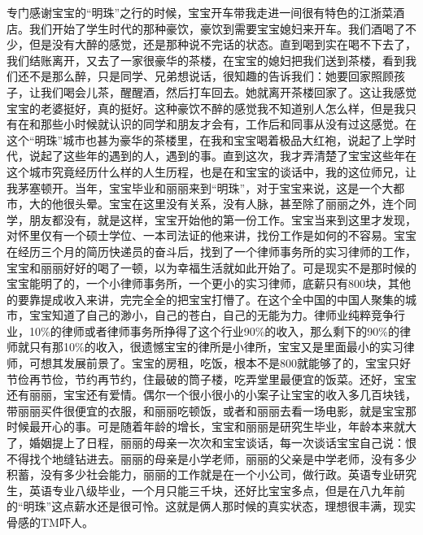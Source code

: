 专门感谢宝宝的“明珠”之行的时候，宝宝开车带我走进一间很有特色的江浙菜酒店。我们开始了学生时代的那种豪饮，豪饮到需要宝宝媳妇来开车。我们酒喝了不少，但是没有大醉的感觉，还是那种说不完话的状态。直到喝到实在喝不下去了，我们结账离开，又去了一家很豪华的茶楼，在宝宝的媳妇把我们送到茶楼，看到我们还不是那么醉，只是同学、兄弟想说话，很知趣的告诉我们：她要回家照顾孩子，让我们喝会儿茶，醒醒酒，然后打车回去。她就离开茶楼回家了。这让我感觉宝宝的老婆挺好，真的挺好。这种豪饮不醉的感觉我不知道别人怎么样，但是我只有在和那些小时候就认识的同学和朋友才会有，工作后和同事从没有过这感觉。在这个“明珠”城市也甚为豪华的茶楼里，在我和宝宝喝着极品大红袍，说起了上学时代，说起了这些年的遇到的人，遇到的事。直到这次，我才弄清楚了宝宝这些年在这个城市究竟经历什么样的人生历程，也是在和宝宝的谈话中，我的这位师兄，让我茅塞顿开。当年，宝宝毕业和丽丽来到“明珠”，对于宝宝来说，这是一个大都市，大的他很头晕。宝宝在这里没有关系，没有人脉，甚至除了丽丽之外，连个同学，朋友都没有，就是这样，宝宝开始他的第一份工作。宝宝当来到这里才发现，对怀里仅有一个硕士学位、一本司法证的他来讲，找份工作是如何的不容易。宝宝在经历三个月的简历快递员的奋斗后，找到了一个律师事务所的实习律师的工作，宝宝和丽丽好好的喝了一顿，以为幸福生活就如此开始了。可是现实不是那时候的宝宝能明了的，一个小律师事务所，一个更小的实习律师，底薪只有800块，其他的要靠提成收入来讲，完完全全的把宝宝打懵了。在这个全中国的中国人聚集的城市，宝宝知道了自己的渺小，自己的苍白，自己的无能为力。律师业纯粹竞争行业，10\%的律师或者律师事务所挣得了这个行业90\%的收入，那么剩下的90\%的律师就只有那10\%的收入，很遗憾宝宝的律所是小律所，宝宝又是里面最小的实习律师，可想其发展前景了。宝宝的房租，吃饭，根本不是800就能够了的，宝宝只好节俭再节俭，节约再节约，住最破的筒子楼，吃弄堂里最便宜的饭菜。还好，宝宝还有丽丽，宝宝还有爱情。偶尔一个很小很小的小案子让宝宝的收入多几百块钱，带丽丽买件很便宜的衣服，和丽丽吃顿饭，或者和丽丽去看一场电影，就是宝宝那时候最开心的事。可是随着年龄的增长，宝宝和丽丽是研究生毕业，年龄本来就大了，婚姻提上了日程，丽丽的母亲一次次和宝宝谈话，每一次谈话宝宝自己说：恨不得找个地缝钻进去。丽丽的母亲是小学老师，丽丽的父亲是中学老师，没有多少积蓄，没有多少社会能力，丽丽的工作就是在一个小公司，做行政。英语专业研究生，英语专业八级毕业，一个月只能三千块，还好比宝宝多点，但是在八九年前的“明珠”这点薪水还是很可怜。这就是俩人那时候的真实状态，理想很丰满，现实骨感的TM吓人。

